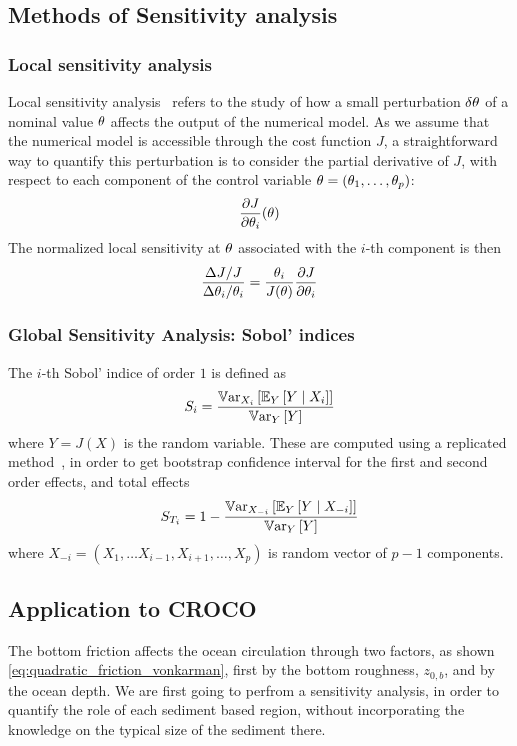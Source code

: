 \documentclass[../../Main_ManuscritThese.tex]{subfiles}
\newcommand{\zob}{z_{0,b}}
\begin{document}
\subsection{Methods of Sensitivity analysis}
\label{sec:methods_SA}
\subsubsection{Local sensitivity analysis}
\label{sec:loca_SA}
Local sensitivity analysis~\cite{morio_global_2011} refers to the
study of how a small perturbation $\delta \theta$ of a nominal value
$\theta$ affects the output of the numerical model. As we assume that the
numerical model is accessible through the cost function $J$, a
straightforward way to quantify this perturbation is to consider the
partial derivative of $J$, with respect to each component of the
control variable $\theta=(\theta_1,\dots,\theta_p)$:
\begin{equation}
  \frac{\partial J}{\partial \theta_i}(\theta)
\end{equation}
The normalized local sensitivity at $\theta$  associated with the $i$-th component is then 
\begin{equation}
  \frac{{\Delta J}/{J}}{{\Delta \theta_i}/{\theta_i}} = \frac{\theta_i}{J(\theta)} \frac{\partial J}{\partial \theta_i}
\end{equation}
\subsubsection{Global Sensitivity Analysis: Sobol' indices}
\label{sec:sobol-indices}
\cite{janon_analyse_2012}
The $i$-th Sobol' indice of order $1$ is defined as 
\begin{equation}
  S_i = \frac{\mathbb{V}\mathrm{ar}_{X_i}\left[\mathbb{E}_{Y}\left[Y \mid X_i\right]\right]}{\mathbb{V}\mathrm{ar}_{Y}\left[Y\right]}
\end{equation}
where $Y = J(X)$ is the random variable. These are computed using a
replicated
method~\cite{gilquin_making_2019,gilquin_echantillonnages_2016}, in
order to get bootstrap confidence interval for the first and second
order effects, and total effects
\begin{equation}
 S_{T_i} = 1 - \frac{\mathbb{V}\mathrm{ar}_{X_{-i}}\left[\mathbb{E}_{Y}\left[Y \mid X_{-i}\right]\right]}{\mathbb{V}\mathrm{ar}_{Y}\left[Y\right]}
\end{equation}
where $X_{-i} = (X_1,\dots X_{i-1},X_{i+1},\dots,X_p)$ is random vector of $p-1$ components.

\subsection{Application to CROCO}
The bottom friction affects the ocean circulation through two factors,
as shown \cref{eq:quadratic_friction_vonkarman}, first by the bottom
roughness, $\zob$, and by the ocean depth. We are first going to
perfrom a sensitivity analysis, in order to quantify the role of each
sediment based region, without incorporating the knowledge on the
typical size of the sediment there.
\end{document}
